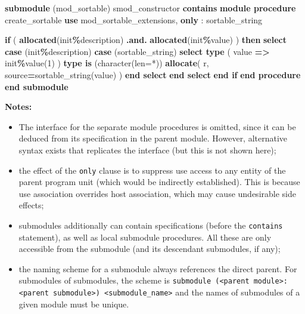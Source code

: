 \documentclass[
  paper=a4,
  ,captions=tableheading
]{scrartcl}
\newenvironment{Shaded}{\begin{snugshade}}{\end{snugshade}}
\newcommand{\DataTypeTok}[1]{\textcolor[rgb]{0.13,0.29,0.53}{#1}}
\newcommand{\DecValTok}[1]{\textcolor[rgb]{0.00,0.00,0.81}{#1}}
\newcommand{\FunctionTok}[1]{\textcolor[rgb]{0.13,0.29,0.53}{\textbf{#1}}}
\newcommand{\KeywordTok}[1]{\textcolor[rgb]{0.13,0.29,0.53}{\textbf{#1}}}
\newcommand{\NormalTok}[1]{#1}
\newcommand{\OperatorTok}[1]{\textcolor[rgb]{0.81,0.36,0.00}{\textbf{#1}}}
\newcommand{\StringTok}[1]{\textcolor[rgb]{0.31,0.60,0.02}{#1}}
\providecommand{\tightlist}{%
  \setlength{\itemsep}{0pt}\setlength{\parskip}{0pt}}
\begin{document}
\begin{Shaded}
\begin{Highlighting}[]
\KeywordTok{submodule}\NormalTok{ (mod\_sortable) smod\_constructor}
\KeywordTok{contains}
  \KeywordTok{module procedure}\NormalTok{ create\_sortable}
  \KeywordTok{use}\NormalTok{ mod\_sortable\_extensions, }\KeywordTok{only}\NormalTok{ : sortable\_string}

  \KeywordTok{if}\NormalTok{ ( }\FunctionTok{allocated}\NormalTok{(init}\OperatorTok{\%}\NormalTok{description) }\OperatorTok{.and.} \FunctionTok{allocated}\NormalTok{(init}\OperatorTok{\%}\DataTypeTok{value}\NormalTok{) ) }\KeywordTok{then}
    \KeywordTok{select case}\NormalTok{ (init}\OperatorTok{\%}\NormalTok{description)}
     \KeywordTok{case}\NormalTok{ (}\StringTok{\textquotesingle{}sortable\_string\textquotesingle{}}\NormalTok{)}
      \KeywordTok{select type}\NormalTok{ ( }\DataTypeTok{value} \KeywordTok{=}\OperatorTok{\textgreater{}}\NormalTok{ init}\OperatorTok{\%}\DataTypeTok{value}\NormalTok{(}\DecValTok{1}\NormalTok{) )}
       \KeywordTok{type is}\NormalTok{ (}\DataTypeTok{character(len=*)}\NormalTok{)}
        \KeywordTok{allocate}\NormalTok{( r, source}\KeywordTok{=}\NormalTok{sortable\_string(}\DataTypeTok{value}\NormalTok{) )}
      \KeywordTok{end select}
    \KeywordTok{end select}
  \KeywordTok{end if}
\KeywordTok{end procedure}
\KeywordTok{end submodule}
\end{Highlighting}
\end{Shaded}

\textbf{Notes:}

\begin{itemize}
\tightlist
\item
  The interface for the separate module procedures is omitted, since it
  can be deduced from its specification in the parent module. However,
  alternative syntax exists that replicates the interface (but this is
  not shown here);
\item
  the effect of the \texttt{only} clause is to suppress use access to
  any entity of the parent program unit (which would be indirectly
  established). This is because use association overrides host
  association, which may cause undesirable side effects;
\item
  submodules additionally can contain specifications (before the
  \texttt{contains} statement), as well as local submodule procedures.
  All these are only accessible from the submodule (and its descendant
  submodules, if any);
\item
  the naming scheme for a submodule always references the direct parent.
  For submodules of submodules, the scheme is
  \texttt{submodule\ (\textless{}parent\ module\textgreater{}:\textless{}parent\ submodule\textgreater{})\ \textless{}submodule\_name\textgreater{}}
  and the names of submodules of a given module must be unique.
\end{itemize}
\end{document}

